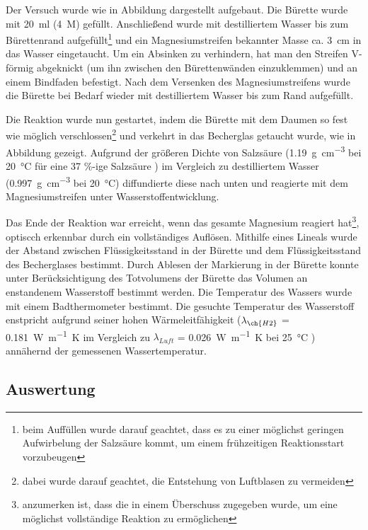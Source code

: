 \documentclass{article}
\begin{document}
    Der Versuch wurde wie in Abbildung dargestellt aufgebaut. Die Bürette wurde mit \SI[mode=text]{20}{\milli\litre}  (\SI[mode=text]{4}{M}) gefüllt. Anschließend wurde mit destilliertem Wasser bis zum Bürettenrand aufgefüllt\footnote{beim Auffüllen wurde darauf geachtet, dass es zu einer möglichst geringen Aufwirbelung der Salzsäure kommt, um einem frühzeitigen Reaktionsstart vorzubeugen} und ein  Magnesiumstreifen bekannter Masse ca. \SI[mode=text]{3}{\centi\meter} in das Wasser eingetaucht. Um ein Absinken zu verhindern, hat man den Streifen V-förmig abgeknickt (um ihn zwischen den Bürettenwänden einzuklemmen) und an einem Bindfaden befestigt. Nach dem Versenken des Magnesiumstreifens wurde die Bürette bei Bedarf wieder mit destilliertem Wasser bis zum Rand aufgefüllt. 
    
    Die Reaktion wurde nun gestartet, indem die Bürette mit dem Daumen so fest wie möglich verschlossen\footnote{dabei wurde darauf geachtet, die Entstehung von Luftblasen zu vermeiden}  und verkehrt in das Becherglas getaucht wurde, wie in Abbildung gezeigt. Aufgrund der größeren Dichte von Salzsäure (\SI[mode=text]{1.19}{\gram\per\cubic\centi\metre} bei \SI[mode=text]{20}{\degreeCelsius} für eine 37 \%-ige Salzsäure \cite{Salzs}) im Vergleich zu destilliertem Wasser (\SI[mode=text]{0.997}{\gram\per\cubic\centi\metre} bei \SI[mode=text]{20}{\degreeCelsius}) diffundierte diese nach unten und reagierte mit dem Magnesiumstreifen unter Wasserstoffentwicklung. 
    
    Das Ende der Reaktion war erreicht, wenn das gesamte Magnesium reagiert hat\footnote{anzumerken ist, dass die  in einem Überschuss zugegeben wurde, um eine möglichst vollständige Reaktion zu ermöglichen}, optiscch erkennbar durch ein vollständiges Auflösen. Mithilfe eines Lineals wurde der Abstand zwischen Flüssigkeitsstand in der Bürette und dem Flüssigkeitsstand des Becherglases bestimmt. Durch Ablesen der Markierung in der Bürette konnte unter Berücksichtigung des Totvolumens der Bürette das Volumen an enstandenem Wasserstoff bestimmt werden. Die Temperatur des Wassers wurde mit einem Badthermometer bestimmt. Die gesuchte Temperatur des Wasserstoff enstpricht aufgrund seiner hohen Wärmeleitfähigkeit ($\lambda_{\ch{H2}}$ = \SI[mode=text]{0.181}{\watt\per\meter\kelvin} im Vergleich zu $\lambda_{Luft}$ = \SI[mode=text]{0.026}{\watt\per\meter\kelvin} bei \SI[mode=text]{25}{\degreeCelsius} \cite{LambdaHydrogen}) annähernd der gemessenen Wassertemperatur.
    
     
    \subsection{Auswertung}
    
\end{document}
